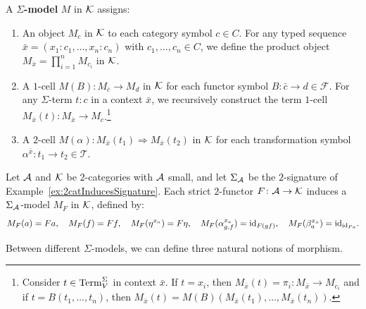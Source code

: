 \begin{definition}
   A \textbf{$\Sigma$-model} $M$ in $\mathcal{K}$ assigns:
   \begin{enumerate}
       \item An object $M_c$ in $\mathcal{K}$ to each category symbol $c \in C$. For any typed sequence $\bar{x} = (x_1 \colon c_1, \dots, x_n \colon c_n)$ with $c_1,\ldots, c_n\in C$, we define the product object $M_{\bar{x}} = \prod_{i=1}^n M_{c_i}$ in $\mathcal{K}$.
       \item A $1$-cell $M(B) \colon M_{\bar{c}} \to M_d$ in $\mathcal{K}$ for each functor symbol $B \colon \bar{c} \to d \in \mathcal{F}$. For any $\Sigma$-term $t \colon c$ in a context $\bar{x}$, we recursively construct the term $1$-cell $M_{\bar{x}}(t) \colon M_{\bar{x}} \to M_c$.\footnote{Consider $t\in \mathrm{Term}^\Sigma_V$ in context $\bar{x}$. If $t = x_i$, then $M_{\bar{x}}(t) = \pi_{i}\colon M_{\bar{x}}\to M_{c_i}$ and if $t = B(t_1,\ldots, t_n)$, then $M_{\bar{x}}(t) = M(B)(M_{\bar{x}}(t_1),\ldots, M_{\bar{x}}(t_n))$.}
       \item A $2$-cell $M(\alpha) \colon M_{\bar{x}}(t_1) \Rightarrow M_{\bar{x}}(t_2)$ in $\mathcal{K}$ for each transformation symbol $\alpha^{\bar{x}} \colon t_1 \to t_2 \in \mathcal{T}$.
   \end{enumerate}
\end{definition}
\begin{example}\label{ex:2FunctorInucingAModel}
Let $\mathcal{A}$ and $\mathcal{K}$ be $2$-categories with $\mathcal{A}$ small, and let $\Sigma_{\mathcal{A}}$ be the $2$-signature of Example~\ref{ex:2catInducesSignature}. Each strict $2$-functor $F \colon \mathcal{A} \to \mathcal{K}$ induces a $\Sigma_{\mathcal{A}}$-model $M_F$ in $\mathcal{K}$, defined by:
\[
M_F(a) = Fa, \quad M_F(f) = Ff, \quad M_F(\eta^{x_a}) = F\eta, \quad M_F(\alpha_{g,f}^{x_a}) = \mathrm{id}_{F(gf)}, \quad M_F(\beta^{x_a}_a) = \mathrm{id}_{\mathrm{id}_{Fa}}.
\]
\end{example}

Between different $\Sigma$-models, we can define three natural notions of morphism.

